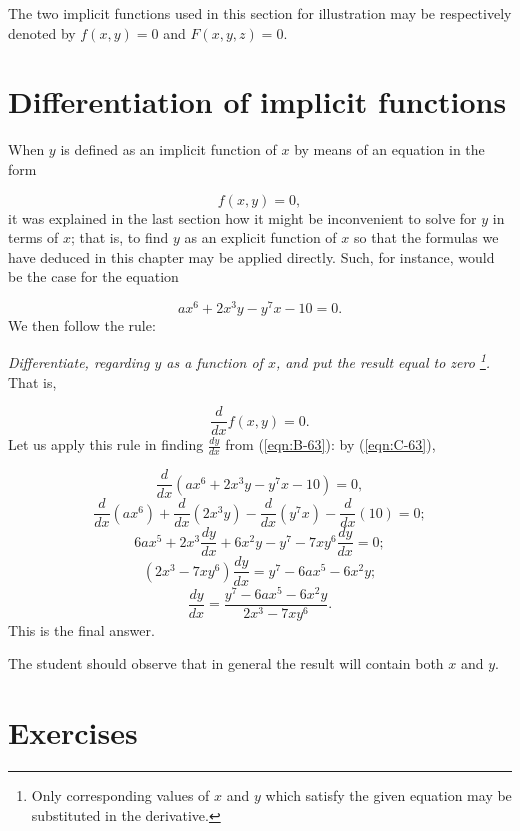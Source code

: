 The two implicit functions used in this %
section %
for illustration may be respectively denoted by
$f(x,y) 	= 0$ and $F(x,y,z) 	= 0$.


\section{Differentiation of implicit functions}
\label{sec:63}

When $y$ is defined as an implicit function of $x$ by means of an equation in the form

\begin{equation}
f(x,y) = 0,
\label{eqn:A-63}
\end{equation}
it was explained in the last section how it might be inconvenient to solve 
for $y$ in terms of $x$; that is, to find $y$ as an explicit function of $x$ 
so that the formulas we have deduced in this chapter may be applied 
directly. Such, for instance, would be the case for the equation

\begin{equation}
ax^6 + 2x^3y - y^7x - 10 = 0.
\label{eqn:B-63}
\end{equation}
We then follow the rule:

{\it Differentiate, regarding $y$ as a function of $x$, 
and put the result equal to zero
\footnote{%
Only corresponding values of $x$ and $y$ which satisfy the given equation 
may be substituted in the derivative.}.}
That is,

\begin{equation}
\frac{d}{dx} f(x, y) = 0.
\label{eqn:C-63}
\end{equation}
Let us apply this rule in finding $\frac{dy}{dx}$ from (\ref{eqn:B-63}):
by (\ref{eqn:C-63}),

\[
\frac{d}{dx}(ax^6 + 2x^3y - y^7x - 10) = 0,
\]
\[
\frac{d}{dx}(ax^6) + \frac{d}{dx}(2x^3y) - \frac{d}{dx}(y^7x) - \frac{d}{dx}(10) = 0;
\]
\[
6ax^5 + 2x^3 \frac{dy}{dx} + 6x^2y - y^7 - 7xy^6\frac{dy}{dx} = 0;
\]
\[
(2x^3 - 7xy^6)\frac{dy}{dx} = y^7 - 6ax^5 - 6x^2y;
\]
\[
\frac{dy}{dx} = \frac{y^7 - 6ax^5 - 6x^2y}{2x^3 - 7xy^6} .
\]
This is the final answer.

The student should observe that in general the result will contain both $x$ and $y$.

\section{Exercises}

